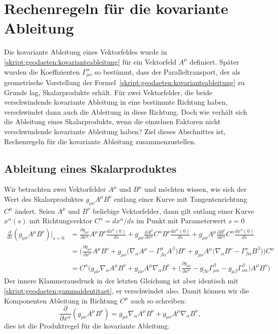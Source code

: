 %

\section{Rechenregeln für die kovariante Ableitung}
Die kovariante Ableitung eines Vektorfeldes wurde in 
\eqref{skript:geodaeten:kovarianteableitung}
für ein Vektorfeld $A^\mu$ definiert.
Später wurden die Koeffizienten $\Gamma^\alpha_{\mu\nu}$ so bestimmt,
dass der Paralleltransport, der als geometrische Vorstellung der
Formel~\eqref{skript:geodaeten:kovarianteableitung} zu Grunde lag,
Skalarprodukte erhält.
Für zwei Vektorfelder, die beide verschwindende
kovariante Ableitung in eine bestimmte Richtung haben,
verschwindet dann auch die Ableitung in diese Richtung.
Doch wie verhält sich die Ableitung eines Skalarprodukts, wenn
die einzelnen Faktoren nicht verschwindende kovariante Ableitung haben?
Ziel dieses Abschnittes ist, Rechenregeln für die kovariante Ableitung
zusammenzustellen.

\subsection{Ableitung eines Skalarproduktes}
Wir betrachten zwei Vektorfelder $A^\mu$ und $B^\mu$ und möchten wissen,
wie sich der Wert des Skalarproduktes $g_{\mu\nu}A^\mu B^\nu$ entlang
einer Kurve mit Tangentenrichtung $C^\mu$ ändert.
Seien $A^\mu$  und $B^\nu$ beliebige Vektorfelder,
dann gilt entlang einer Kurve $x^\alpha(s)$ mit
Richtungsvektor $C^\alpha = dx^\alpha/ds$ im Punkt mit Parameterwert $s=0$
\begin{align*}
\frac{d}{ds}(g_{\mu\nu}A^\mu B^\nu)\bigg|_{s=0}
&=
\frac{\partial g_{\mu\nu}}{\partial x^\alpha}A^\mu B^\nu
\frac{dx^\alpha(0)}{ds}
+
g_{\mu\nu}\frac{\partial A^\mu}{\partial x^\alpha}C^\alpha B^\nu
\frac{dx^\alpha(0)}{ds}
+
g_{\mu\nu}A^\mu \frac{\partial B^\nu}{\partial x^\alpha}C^\alpha
\frac{dx^\alpha(0)}{ds}
\\
&=
\biggl(
\frac{\partial g_{\mu\nu}}{\partial x^\alpha} A^\mu B^\nu
+
g_{\mu\nu}
\biggl(\nabla_\alpha A^\mu - \Gamma^\mu_{\beta\alpha}A^\beta \biggr)
B^\nu
+
g_{\mu\nu}A^\mu \biggl(\nabla_\alpha B^\nu-\Gamma^\nu_{\beta\alpha}B^\beta\biggr)
\biggr)C^\alpha
\\
&=
C^\alpha
\biggl(
g_{\mu\nu}\nabla_\alpha A^\mu B^\nu
+
g_{\mu\nu}A^\mu\nabla_\alpha B^\nu
+
\biggl(
\frac{\partial g_{\mu\nu}}{\partial x^\alpha}
-g_{\beta\nu}\Gamma^\beta_{\mu\alpha}
-g_{\mu\beta}\Gamma^\beta_{\nu\alpha}
\biggr)A^\mu B^\nu
\biggr)
\end{align*}
Der innere Klammerausdruck in der letzten Gleichung ist aber identisch
mit \eqref{skript:geodaeten:gammaidentitaet}, er verschwindet also.
Damit können wir die Komponenten Ableitung in Richtung $C^\mu$ auch
so schreiben:
\[
\frac{\partial}{\partial x^\alpha}
(g_{\mu\nu}A^\mu B^\nu)
=
g_{\mu\nu}\nabla_\alpha A^\mu B^\nu
+
g_{\mu\nu}A^\mu\nabla_\alpha B^\nu,
\]
dies ist die Produktregel für die kovariante Ableitung.


